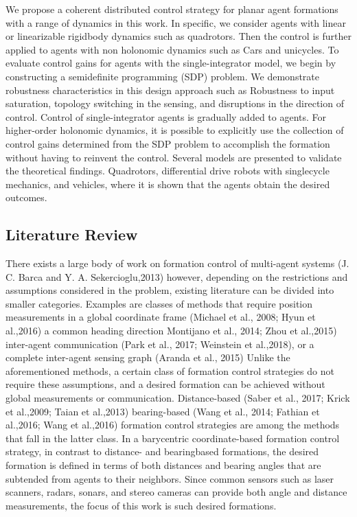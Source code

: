 \documentclass[10pt]{article}
\begin{document}
We propose a coherent distributed control strategy for planar agent formations with a range of dynamics in this work. In specific, we consider agents with linear or linearizable rigidbody dynamics such as quadrotors. Then the control is further applied to agents with non holonomic dynamics such as Cars and unicycles. To evaluate control gains for agents with the single-integrator model, we begin by constructing a semidefinite programming (SDP) problem. We demonstrate robustness characteristics in this design approach such as Robustness to input saturation, topology switching in the sensing, and disruptions in the direction of control. Control of single-integrator agents is gradually added to agents. For higher-order holonomic dynamics, it is possible to explicitly use the collection of control gains determined from the SDP problem to accomplish the formation without having to reinvent the control. Several models are presented to validate the theoretical findings. Quadrotors, differential drive robots with singlecycle mechanics, and vehicles, where it is shown that the agents obtain the desired outcomes.

\subsection{Literature Review}
There exists a large body of work on formation control of multi-agent systems (J. C. Barca and Y. A. Sekercioglu,2013) however, depending on the restrictions and assumptions considered in the problem, existing literature can be divided into smaller categories. Examples are classes of methods that require position measurements in a global coordinate frame (Michael et al., 2008; Hyun et al.,2016) a common heading direction Montijano et al., 2014; Zhou et al.,2015) inter-agent communication (Park et al., 2017; Weinstein et al.,2018), or a complete inter-agent sensing graph (Aranda et al., 2015) Unlike the aforementioned methods, a certain class of formation control strategies do not require these assumptions, and a desired formation can be achieved without global measurements or communication. Distance-based (Saber et al., 2017; Krick et al.,2009; Taian et al.,2013) bearing-based (Wang et al., 2014; Fathian et al.,2016; Wang et al.,2016) formation control strategies are among the methods that fall in the latter class. In a barycentric coordinate-based formation control strategy, in contrast to distance- and bearingbased formations, the desired formation is defined in terms of both distances and bearing angles that are subtended from agents to their neighbors. Since common sensors such as laser scanners, radars, sonars, and stereo cameras can provide both angle and distance measurements, the focus of this work is such desired formations.
\end{document}
